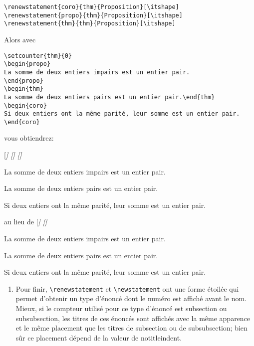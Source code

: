 \documentclass[french,ColorTheme=USAF,FontSize=10pt]{tango}
\newcommand\TO[1]{\textsf{#1}}
\begin{document}
\begin{example}[Exemples]
\begin{enumerate}[resume]
\begin{tcolorbox}
\begin{verbatim}
\renewstatement{coro}{thm}{Proposition}[\itshape]
\renewstatement{propo}{thm}{Proposition}[\itshape]
\renewstatement{thm}{thm}{Proposition}[\itshape]
\end{verbatim}
\end{tcolorbox}
Alors avec 
\begin{tcolorbox}
\begin{verbatim}
\setcounter{thm}{0}
\begin{propo}
La somme de deux entiers impairs est un entier pair.
\end{propo}
\begin{thm}
La somme de deux entiers pairs est un entier pair.\end{thm}
\begin{coro}
Si deux entiers ont la même parité, leur somme est un entier pair.
\end{coro}
\end{verbatim}
\end{tcolorbox}
vous obtiendrez:
\end{enumerate}
[\itshape]
[\itshape]
[\itshape]
\setcounter{thm}{0}
\begin{propo}
La somme de deux entiers impairs est un entier pair.
\end{propo}
\begin{thm}
La somme de deux entiers pairs est un entier pair.
\end{thm}
\begin{coro}
Si deux entiers ont la même parité, leur somme est un entier pair.
\end{coro}
%
au lieu de 
%
\setcounter{thm}{0}\setcounter{propo}{0}
[\itshape]
[\itshape]
\begin{propo}
La somme de deux entiers impairs est un entier pair.
\end{propo}
\begin{thm}
La somme de deux entiers pairs est un entier pair.
\end{thm}
\begin{coro}
Si deux entiers ont la même parité, leur somme est un entier pair.
\end{coro}
\begin{enumerate}[resume]
\item Pour finir, \verb+\renewstatement+ et \verb+\newstatement+ ont une forme étoilée qui permet d'obtenir un type d'énoncé dont le numéro est affiché avant le nom. Mieux, si le compteur utilisé pour ce type d'énoncé est  \TO{subsection} ou \TO{subsubsection}, les titres de ces énoncés sont affichés avec la même apparence et le même placement que les titres de subsection ou de subsubsection; bien sûr ce placement dépend de la valeur de \TO{notitleindent}.

\end{enumerate}
\end{example}
\end{document}
